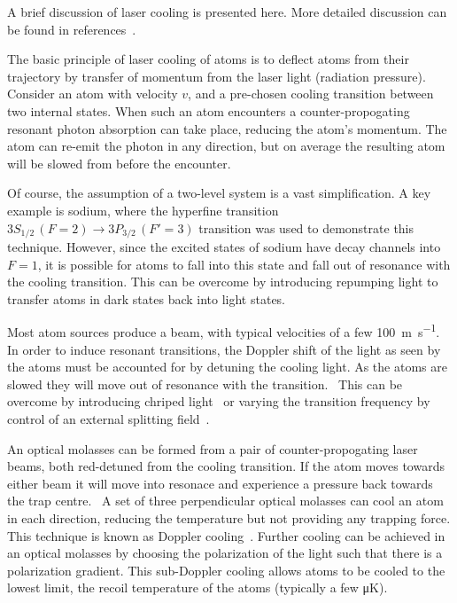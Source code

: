 A brief discussion of laser cooling is presented here. More detailed discussion
can be found in references~\cite{Metcalf1999,RevModPhys.70.721,McCarron_2018}.

The basic principle of laser cooling of atoms is to deflect atoms from their
trajectory by transfer of momentum from the laser light (radiation
pressure).~\cite{RevModPhys.70.721} Consider an atom with velocity $v$, and a
pre-chosen cooling transition between two internal states.  When such an atom
encounters a counter-propogating resonant photon absorption can take place,
reducing the atom's momentum. The atom can re-emit the photon in any direction,
but on average the resulting atom will be slowed from before the encounter.

Of course, the assumption of a two-level system is a vast simplification.  A key
example is sodium, where the hyperfine transition $3S_{1/2}\, (F=2) \rightarrow
3P_{3/2}\, (F'=3)$ transition was used to demonstrate this technique. However,
since the excited states of sodium have decay channels into $F=1$, it is
possible for atoms to fall into this state and fall out of resonance with the
cooling transition.  This can be overcome by introducing repumping light to
transfer atoms in dark states back into light states.~\cite{RevModPhys.70.721}

Most atom sources produce a beam, with typical velocities of a few
\SI{100}{\metre\per\second}.~\cite{Metcalf1999,} In order to induce resonant
transitions, the Doppler shift of the light as seen by the atoms must be
accounted for by detuning the cooling light. As the atoms are slowed they will
move out of resonance with the transition.~\cite{RevModPhys.70.721} This can be
overcome by introducing chriped light~\cite{Prodan1984} or varying the
transition frequency by control of an external splitting
field~\cite{PhysRevLett.48.596}.

An optical molasses can be formed from a pair of counter-propogating laser
beams, both red-detuned from the cooling transition. If the atom moves towards
either beam it will move into resonace and experience a pressure back towards
the trap centre.~\cite{} A set of three perpendicular optical molasses can
cool an atom in each direction, reducing the temperature but not providing any
trapping force. This technique is known as Doppler cooling~\cite{}. Further
cooling can be achieved in an optical molasses by choosing the polarization of
the light such that there is a polarization gradient. This sub-Doppler cooling
allows atoms to be cooled to the lowest limit, the recoil temperature of the
atoms (typically a few \si{\micro\kelvin}).~

